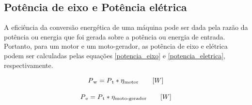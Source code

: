 \subsection{Potência de eixo e Potência elétrica}

A eficiência da conversão energética de uma máquina pode ser dada pela razão da potência ou energia que foi gerada sobre a potência ou energia de entrada. Portanto, para um motor e um moto-gerador, as potência de eixo e elétrica podem ser calculadas pelas equações \ref{potencia_eixo} e \ref{potencia_eletrica}, respectivamente.

\begin{equation} \label{potencia_eixo}
P\textsubscript{w} = P\textsubscript{t} * \eta\textsubscript{motor} \qquad [W]
\end{equation}

\begin{equation} \label{potencia_eletrica}
P\textsubscript{e} = P\textsubscript{t} * \eta\textsubscript{moto-gerador} \qquad [W]
\end{equation}


